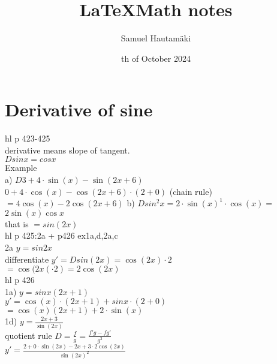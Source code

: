 \documentclass{article}
\title{\LaTeX Math notes}
\author{Samuel Hautamäki}
\date{th of October 2024}
\begin{document}
  \maketitle
   
  \section{Derivative of sine}
  hl p 423-425\\
  derivative means slope of tangent.\\
  $D sin x = cos x$\\
  Example\\
  a) $D 3+4\cdot\sin(x)-\sin(2x+6)$\\
  $0 + 4\cdot \cos(x) - \cos(2x+6)\cdot(2+0)$ (chain rule)\\
  $=4\cos(x)-2\cos(2x+6)$
  b) $D sin^2x = 2\cdot\sin(x)^1\cdot\cos(x)=$\\
  $2\sin(x)\cos x$\\
  that is $=sin(2x)$\\
  hl p 425:2a + p426 ex1a,d,2a,c\\
  2a $y=sin 2x$\\
  differentiate $y'=D sin(2x)=\cos(2x)\cdot2$\\
  $=\cos(2x( \cdot2)=2\cos(2x)$\\
  hl p 426\\
  1a) $y=sin x(2x+1)$\\
  $y'=\cos(x)\cdot(2x+1)+sin x\cdot(2+0)$\\
  $=\cos(x)(2x+1)+2\cdot\sin(x)$\\
  1d) $y=\frac{2x+3}{\sin(2x)}$\\
  quotient rule $D=\frac{f}{g}=\frac{f'g-fg'}{g^2}$\\
  $y'=\displaystyle\frac{2+0\cdot\sin(2x)-2x+3\cdot2\cos(2x)}{\sin(2x)^2}$\\

   
\end{document}

